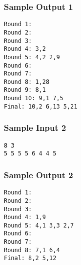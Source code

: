 \subsubsection{Sample Output 1}\label{sample-output-1}
\begin{verbatim}
Round 1:
Round 2:
Round 3:
Round 4: 3,2
Round 5: 4,2 2,9
Round 6:
Round 7:
Round 8: 1,28
Round 9: 8,1
Round 10: 9,1 7,5
Final: 10,2 6,13 5,21
\end{verbatim}

\subsubsection{Sample Input 2}\label{sample-input-2}
\begin{verbatim}
8 3
5 5 5 5 6 4 4 5
\end{verbatim}

\subsubsection{Sample Output 2}\label{sample-output-2}
\begin{verbatim}
Round 1:
Round 2:
Round 3:
Round 4: 1,9
Round 5: 4,1 3,3 2,7
Round 6:
Round 7:
Round 8: 7,1 6,4
Final: 8,2 5,12
\end{verbatim}